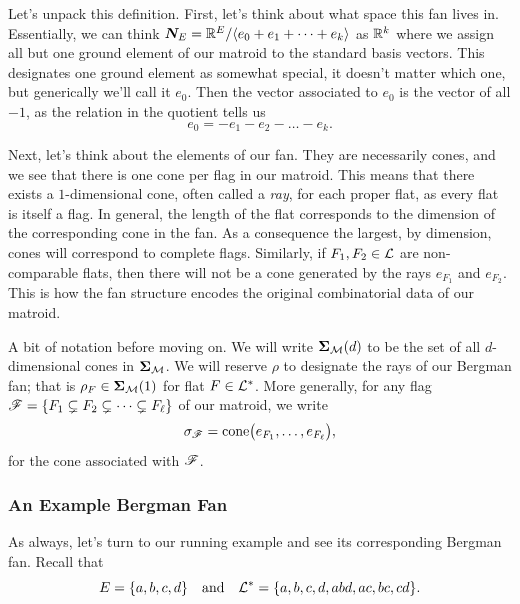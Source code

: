 \documentclass[12pt,oneside]{../../sfsuthesis}
\begin{document}
Let's unpack this definition.
First, let's think about what space this fan lives in.
Essentially, we can think \( \bm{N}_E = \mathbb{R}^{E}/\langle e_0 + e_1 + \cdots + e_k \rangle \) as \( \mathbb{R}^k \) where we assign all but one ground element of our matroid to the standard basis vectors.
This designates one ground element as somewhat special, it doesn't matter which one, but generically we'll call it \( e_0 \).
Then the vector associated to \( e_0 \) is the vector of all \( -1 \), as the relation in the quotient tells us
\[
    e_0 = -e_1 - e_2 - \dots - e_k.
\]

Next, let's think about the elements of our fan.
They are necessarily cones, and we see that there is one cone per flag in our matroid.
This means that there exists a \( 1 \)-dimensional cone, often called a \textit{ray}, for each proper flat, as every flat is itself a flag.
In general, the length of the flat corresponds to the dimension of the corresponding cone in the fan.
As a consequence the largest, by dimension, cones will correspond to complete flags.
Similarly, if \( F_1, F_2 \in \mathcal{L} \) are non-comparable flats, then there will not be a cone generated by the rays \( e_{F_1} \) and \( e_{F_2} \).
This is how the fan structure encodes the original combinatorial data of our matroid.

A bit of notation before moving on.
We will write \( \bm{\Sigma}_{\mathcal{M}}(d) \) to be the set of all \( d \)-dimensional cones in \( \bm{\Sigma}_{\mathcal{M}} \).
We will reserve \( \rho \) to designate the rays of our Bergman fan; that is \( \rho_F \in \bm{\Sigma}_{\mathcal{M}}(1) \) for flat \( F \in \mathcal{L}^\ast \).
More generally, for any flag \( \mathscr{F} = \{ F_1 \subsetneq F_2 \subsetneq \cdots \subsetneq F_\ell \} \) of our matroid, we write
\[
    \sigma_{\mathscr{F}} = \mathrm{cone}\bigl( e_{F_1}, \dots, e_{F_\ell} \bigr),
\]
for the cone  associated with \(\mathscr{F}\).

\subsubsection{An Example Bergman Fan}
As always, let's turn to our running example and see its corresponding Bergman fan.
Recall that
\[
    E = \{ a, b, c, d \} \quad \text{and} \quad \mathcal{L}^\ast = \{ a, b, c, d, abd, ac, bc, cd \}.
\]
\end{document}
